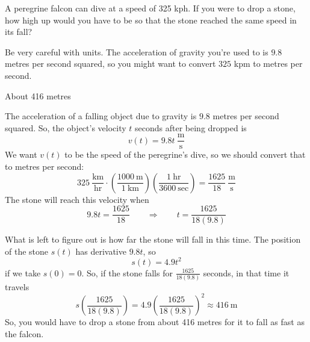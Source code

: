 \begin{question}
A peregrine falcon can dive at a speed of 325 kph. If you were to drop a stone, how high up would you have to be so that the stone reached the same speed in its fall?
\end{question}
\begin{hint}
Be very careful with units. The acceleration of gravity you're used to is $9.8$ metres per second squared, so you might want to convert $325$ kpm to metres per second.
\end{hint}
\begin{answer}
About 416 metres
\end{answer}
\begin{solution}
The acceleration of a falling object due to gravity is $9.8$ metres per second squared. So, the object's velocity $t$ seconds after being dropped is
\[v(t)=9.8t~\frac{\mathrm{m}}{\mathrm{s}}\]
We want $v(t)$ to be the speed of the peregrine's dive, so we should convert that to metres per second:
\[325~\frac{\mathrm{km}}{\mathrm{hr}}\cdot
\left(\frac{1000~\mathrm{m}}{1~\mathrm{km}}\right)\left(\frac{1~\mathrm{hr}}{3600~\mathrm{sec}}\right)=\frac{1625}{18}~\frac{\mathrm{m}}{\mathrm{s}}\]
The stone will reach this velocity when
\[9.8t=\frac{1625}{18}\qquad\Rightarrow\qquad t=\frac{1625}{18(9.8)}\]

What is left to figure out is how far the stone will fall in this time. The position of the stone $s(t)$ has derivative $9.8t$, so
\[s(t)=4.9t^2\]
if we take $s(0)=0$. So, if the stone falls for $\frac{1625}{18(9.8)}$ seconds, in that time it travels
\[s\left(\frac{1625}{18(9.8)}\right)=4.9\left(\frac{1625}{18(9.8)}\right)^2\approx 416 ~\mathrm{m}\]
So, you would have to drop a stone from about 416 metres for it to fall as fast as the falcon.
\end{solution}

